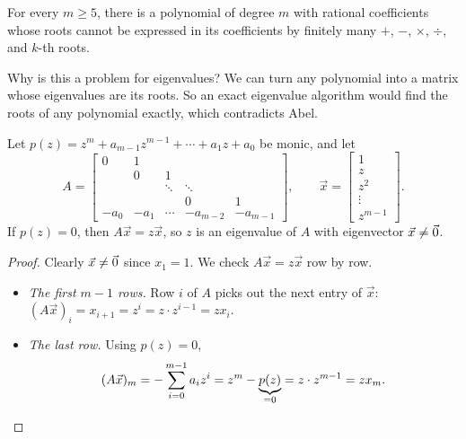 \begin{theorem}
  \label{thm:abel}
  For every $m \ge 5$, there is a polynomial of degree $m$ with rational coefficients whose roots cannot be expressed in its coefficients by finitely many $+$, $-$, $\times$, $\div$, and $k$-th roots.
\end{theorem}

Why is this a problem for eigenvalues? We can turn any polynomial into a matrix whose eigenvalues are its roots. So an exact eigenvalue algorithm would find the roots of any polynomial exactly, which contradicts Abel.

\begin{lemma}
  \label{lem:companion}
  Let $p(z) = z^m + a_{m-1}z^{m-1} + \cdots + a_1z + a_0$ be monic, and let
  \begin{equation}
    A = \begin{bmatrix}
      0 & 1 & & & \\
      & 0 & 1 & & \\
      & & \ddots & \ddots & \\
      & & & 0 & 1 \\
      -a_0 & -a_1 & \cdots & -a_{m-2} & -a_{m-1}
    \end{bmatrix}, \qquad
    \vec{x} = \begin{bmatrix} 1 \\ z \\ z^2 \\ \vdots \\ z^{m-1} \end{bmatrix}.
  \end{equation}
  If $p(z) = 0$, then $A\vec{x} = z\vec{x}$, so $z$ is an eigenvalue of $A$ with eigenvector $\vec{x} \ne \vec{0}$.
\end{lemma}

\begin{proof}
  Clearly $\vec{x} \ne \vec{0}$ since $x_1 = 1$. We check $A\vec{x} = z\vec{x}$ row by row.
  \begin{itemize}
    \item \emph{The first $m - 1$ rows.} Row $i$ of $A$ picks out the next entry of $\vec{x}$: $(A\vec{x})_i = x_{i+1} = z^i = z \cdot z^{i-1} = zx_i$.
    \item \emph{The last row.} Using $p(z) = 0$,
    \begin{equation*}
      (A\vec{x})_m = -\sum_{i=0}^{m-1}a_iz^i = z^m - \underbrace{p(z)}_{=0} = z \cdot z^{m-1} = zx_m. \qedhere
    \end{equation*}
  \end{itemize}
\end{proof}

